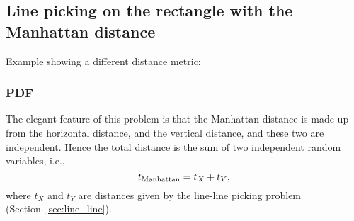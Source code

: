 \subsection{Line picking on the rectangle with the Manhattan distance}
\label{sec:rect_manhattan}

Example showing a different distance metric: 


\subsubsection{PDF}

The elegant feature of this problem is that the Manhattan distance is
made up from the horizontal distance, and the vertical distance, and
these two are independent. Hence the total distance is the sum of two
independent random variables, i.e.,
\[ t_{\rm Manhattan} = t_X + t_Y, \]
where $t_X$ and $t_Y$ are distances given by the line-line picking
problem (Section~\ref{sec:line_line}).


